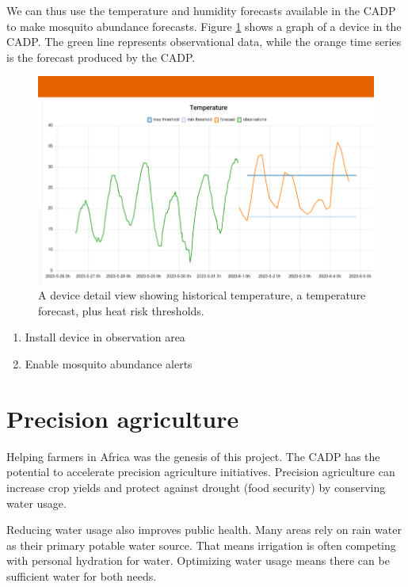 \documentclass[
]{book}
\begin{document}
We can thus use the temperature and humidity forecasts available in the CADP
to make mosquito abundance forecasts.
Figure \ref{fig:cadp-device} shows a graph of a device in the CADP.
The green line represents observational data,
while the orange time series is the forecast produced by the CADP.

\begin{figure}

{\centering \includegraphics[width=12.12in]{images/cadp_device} 

}

\caption{A device detail view showing historical temperature, a temperature forecast, plus heat risk thresholds.}\label{fig:cadp-device}
\end{figure}

\begin{enumerate}
\item Install device in observation area
\item Enable mosquito abundance alerts
\end{enumerate}

\hypertarget{precision-agriculture}{%
\section{Precision agriculture}\label{precision-agriculture}}

Helping farmers in Africa was the genesis of this project.
The CADP has the potential to accelerate precision agriculture initiatives.
Precision agriculture can increase crop yields and protect against
drought (food security) by conserving water usage.

Reducing water usage also improves public health.
Many areas rely on rain water as their primary potable water source.
That means irrigation is often competing with personal hydration for water.
Optimizing water usage means there can be sufficient water for both needs.
\end{document}
